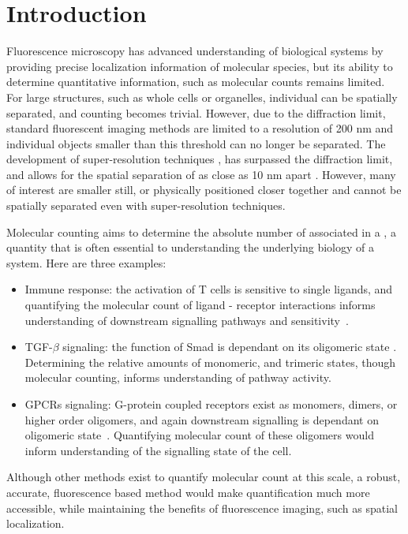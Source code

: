 \section{Introduction}

Fluorescence microscopy has advanced understanding of biological systems by providing precise localization information 
  of molecular species, but its ability to determine quantitative information, such as molecular counts remains limited.
  For large structures, such as whole cells or organelles, individual \objects can be spatially separated, 
  and counting becomes trivial.
  However, due to the diffraction limit, standard fluorescent imaging methods are limited to a resolution of 200 nm and 
  individual objects smaller than this threshold can no longer be separated.
  The development of super-resolution techniques \cite{betzig_2006, rust_2006}, has surpassed the diffraction limit, and allows
  for the spatial separation of \objects as close as 10 nm apart \cite{valli_seeing_2021}.
  However, many \objects of interest are smaller still, or physically positioned closer 
  together and cannot be spatially separated even with super-resolution techniques.

Molecular counting aims to determine the absolute number of \smallobjects
  associated in a \object, a quantity that is often essential to understanding the
  underlying biology of a system. 
  Here are three examples:
  \begin{itemize}
  
    \item Immune response: the activation of T cells is sensitive to single ligands, and quantifying 
      the molecular count of ligand - receptor interactions informs understanding of downstream signalling pathways and sensitivity~\cite{irvine_2002}.

    \item TGF-$\beta$ signaling: the function of Smad is dependant on its oligomeric state \cite{inman_2002, moustakas_2002}. Determining the relative 
      amounts of monomeric, and trimeric states, though molecular counting, informs understanding of pathway activity.

    \item GPCRs signaling: G-protein coupled receptors exist as monomers, dimers, or higher order oligomers, 
      and again downstream signalling is dependant on oligomeric state~\cite{felce_2018, breitwieser_2004}.
      Quantifying molecular count of these oligomers would inform understanding of the signalling state of the cell.

    \end{itemize}
    Although other methods exist to quantify molecular count at this scale, a robust, accurate, %
    fluorescence based method would make quantification much more accessible, while maintaining the benefits
    of fluorescence imaging, such as spatial localization.

